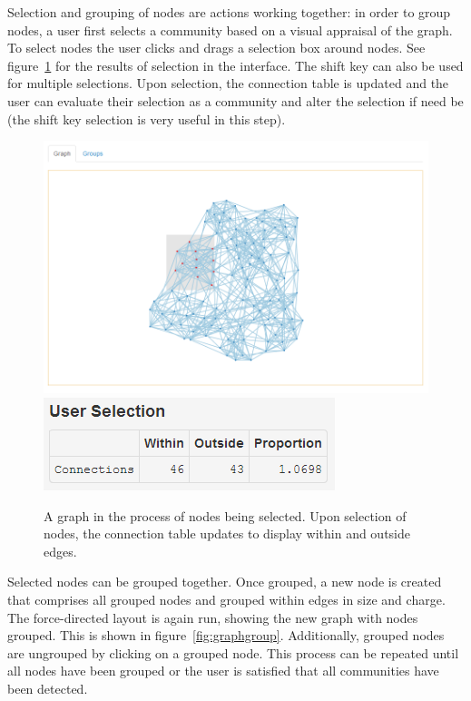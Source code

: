 \documentclass{article}\usepackage[]{graphicx}\usepackage[]{color}
\begin{document}
Selection and grouping of  nodes are actions working together: in order to group nodes, a user  first selects a community based on a visual appraisal of the graph. To select nodes the user clicks and drags a selection box around nodes. See figure~\ref{fig:graphselect} for the results of selection in the interface. The shift key can also be used for multiple selections. Upon selection, the connection table is updated and the user can evaluate their selection as a community and alter the selection if need be (the shift key selection is very useful in this step).

\begin{figure}[H]
\centering
\includegraphics[width=\textwidth]{images/graphselect.png}
\includegraphics[]{images/tableselect.png}
\caption{\label{fig:graphselect} A graph in the process of nodes being selected. Upon selection of nodes, the connection table updates to display within and outside edges.}
\end{figure}

Selected nodes can be grouped together. Once grouped, a new node is created that comprises all grouped nodes and grouped within edges in size and charge. The force-directed layout is again run, showing the new graph with nodes grouped. This is shown in figure~\ref{fig:graphgroup}. Additionally, grouped nodes are ungrouped by clicking on a grouped node. This process can be repeated until all nodes have been grouped or the user is satisfied that all communities have been detected. 
\end{document}
